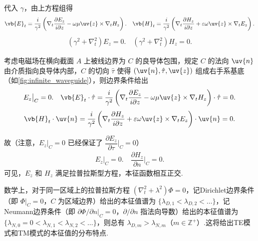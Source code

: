 代入 \(\gamma\)，由上方程组得
\begin{align*}
	\vb{E}_t = \dfrac{i}{\gamma^2} \left( \nabla_t \dfrac{\partial E_z}{i\partial z} - \omega\mu \uv{z} \times \nabla_t H_z \right). \quad \vb{H}_t = \dfrac{i}{\gamma^2} \left( \nabla_t \dfrac{\partial H_z}{i\partial z} + \varepsilon\omega \uv{z} \times \nabla_t E_z \right).
\end{align*}
\begin{align*}
	(\gamma^2 + \nabla_t^2) E_z = 0. \quad (\gamma^2 + \nabla_t^2) H_z = 0.
\end{align*}

考虑电磁场在横向截面 \(A\) 上被线边界为 \(C\) 的良导体包围，规定 \(C\) 的法向 \(\uv{n}\) 由介质指向良导体内部，\(C\) 的切向 \(\hat{\tau}\) 使得 \((\uv{n}, \hat{\tau}, \uv{z})\) 组成右手系基底（如\cref{fig:infinite_waveguide}），则边界条件给出
\begin{align*}
	E_z \big|_C = 0. \quad \vb{E}_t \cdot \hat{\tau} = \dfrac{i}{\gamma^2} \left( \nabla_t \dfrac{\partial E_z}{i\partial z} - \omega\mu \uv{z} \times \nabla_t H_z \right) \cdot \hat{\tau} = 0.
\end{align*}
\begin{align*}
	\vb{H}_t \cdot \uv{n} = \dfrac{i}{\gamma^2} \left( \nabla_t \dfrac{\partial H_z}{i\partial z} + \varepsilon\omega \uv{z} \times \nabla_t E_z \right) \cdot \uv{n} = 0.
\end{align*}

故（注意，\(E_z \big|_C = 0\) 已经保证了 \(\dfrac{\partial E_z}{\partial \tau} \big|_C = 0\)）
\begin{align*}
	E_z \big|_C = 0. \quad \dfrac{\partial H_z}{\partial n} \big|_C = 0.
\end{align*}
可见，\(E_z\) 和 \(H_z\) 满足拉普拉斯型方程，本征函数相互正交.
\begin{note}
	数学上，对于同一区域上的拉普拉斯方程 \((\nabla_t^2 + \lambda^2) \Phi = 0\)，记Dirichlet边界条件（即 \(\Phi \big|_C = 0\)，\(C\) 为区域边界）给出的本征值谱为 \(\{\lambda_{D,1} < \lambda_{D,2} < \dots\}\)，记Neumann边界条件（即 \(\partial \Phi/\partial n \big|_C = 0\)，\(\partial/\partial n\) 指法向导数）给出的本征值谱为 \(\{\lambda_{N,0} = 0 < \lambda_{N,1} < \lambda_{N,2} < \dots\}\)，则总有 \(\lambda_{D,m} > \lambda_{N,m}\)（\(m \in \mathbb{Z}^+\)）.这将给出TE模式和TM模式的本征值的分布特点.
\end{note}

